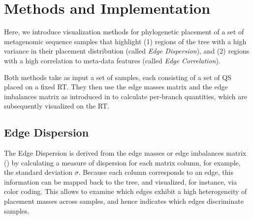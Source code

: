 
\section{Methods and Implementation}
\label{ch:Visualization:sec:Methods}

Here, we introduce visualization methods for phylogenetic placement of a set of metagenomic sequence samples
that highlight (1) regions of the tree with a high variance in their placement distribution (called \emph{Edge Dispersion}),
and (2) regions with a high correlation to meta-data features (called \emph{Edge Correlation}).

Both methods take as input a set of samples, each consisting of a set of \acf{QS} placed on a fixed \acf{RT}.
They then use the edge masses matrix and the edge imbalances matrix
as introduced in 
to calculate per-branch quantities, which are subsequently visualized on the \ac{RT}.


\subsection{Edge Dispersion}
\label{ch:Visualization:sec:Methods:sub:EdgeDispersion}

The Edge Dispersion is derived from the edge masses or edge imbalances matrix
()
by calculating a measure of dispersion for each matrix column, for example, the standard deviation $\sigma$.
Because each column corresponds to an edge, this information can be mapped back to the tree,
and visualized, for instance, via color coding.
This allows to examine which edges exhibit a high heterogeneity of placement masses across samples,
and hence indicates which edges discriminate samples.

